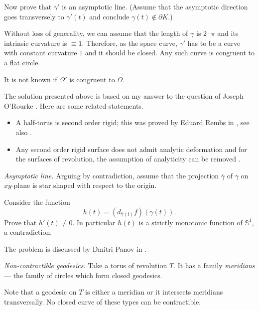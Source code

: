 Now prove that $\gamma'$ is an asymptotic line.
(Assume that the asymptotic direction goes transversely to $\gamma'(t)$ and conclude $\gamma(t)\notin\partial K$.)

Without loss of generality, we can assume that the length of $\gamma$ is $2{\cdot}\pi$ and its intrinsic curvature is $\equiv 1$.
Therefore, as the space curve,
$\gamma'$ has to be a curve with constant curvature $1$ and it should be closed.
Any such curve is congruent to a flat circle.

 It is not known if $\Omega'$ is congruent to $\Omega$.

The solution presented above is based on my answer 
to the question of Joseph O'Rourke \cite[see][]{rourke}.
Here are some related statements.
\begin{itemize}
\item A half-torus is second order rigid;
this was proved by Eduard Rembs in
\cite{rembs}, see also \cite[][135]{efimov}.
\item Any second order rigid surface does not admit analytic deformation 
\cite[proved by Nikolay Efimov, see][121]{efimov}
and for the surfaces of revolution, the assumption of analyticity can be removed 
\cite[proved by Idzhad Sabitov, see][]{sabitov}.
\end{itemize}






\textit{Asymptotic line.}
Arguing by contradiction, assume that the projection $\bar\gamma$
of $\gamma$ on $x y$-plane is star shaped with respect to the origin.

Consider the function 
$$h(t)=(d_{\bar\gamma(t)}f)(\gamma(t)).$$
Prove that $h'(t)\ne 0$.
In particular $h(t)$ is a strictly monotonic function of $\mathbb{S}^1$, a contradiction.

The problem is discussed by Dmitri Panov in \cite{panov-curves}.


\textit{Non-contractible geodesics.}
Take a torus of revolution $T$.
It has a family \emph{meridians} --- the family of circles which form closed geodesics.

Note that a geodesic on $T$ is either a meridian
or it intersects meridians transversally.
No closed curve of these types can be contractible. 




